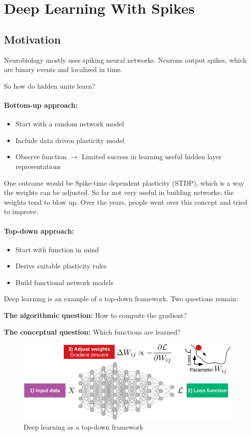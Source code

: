 \documentclass[main]{subfiles}
\begin{document}
\newpage
\section{Deep Learning With Spikes}


\subsection{Motivation}
Neurobiology mostly uses spiking neural networks. Neurons output spikes, which are binary events and localized in time. 

So how do hidden units learn?
\paragraph{Bottom-up approach:}
\begin{itemize}
    \item Start with a random network model
    \item Include data driven plasticity model
    \item Observe function $\rightarrow$ Limited success in learning useful hidden layer representations
\end{itemize}
One outcome would be Spike-time dependent plasticity (STDP), which is a way the weights can be adjusted. So far not very useful in building networks; the weights tend to blow up. Over the years, people went over this concept and tried to improve. 

\paragraph{Top-down approach:}
\begin{itemize}
    \item Start with function in mind
    \item Derive suitable plasticity rules
    \item Build functional network models
\end{itemize}
Deep learning is an example of a top-down framework. Two questions remain: 

\textbf{The algorithmic question:} How to compute the gradient?

\textbf{The conceptual question:} Which functions are learned?

\begin{figure}[H]
    \centering
    \includegraphics[width=0.95\linewidth]{10_DeepLearningWithSpikes/figures/deeplearning.png}
    \caption{Deep learning as a top-down framework}
    \label{fig:my_label}
\end{figure}
\end{document}
